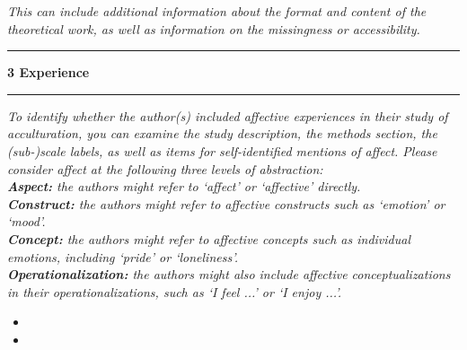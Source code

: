 \documentclass[10pt,a4paper]{protocol}
\newlength{\rulewidth}
\newlength{\ruleandnamegap}
\newcommand{\namefont}{\tiny}
\newcommand{\ruleandname}[2]{%
  \par\noindent
  \rule{#2}{\rulewidth}\par
  \vspace{\dimexpr-\baselineskip+\ruleandnamegap}
  \noindent{\namefont #1}\par
  \addvspace{\baselineskip}
}
\newcommand\category[2]{
{\Large\bfseries\color{emphasis} \vspace{0.25em} #1 \hspace{0.5em} #2 \\ [-0.6em] \rule{\textwidth}{0.4pt} \vspace{0.25em}}
}
\begin{document}
\clearpage
\vspace*{2em}

\textit{This can include additional information about the format and content of the theoretical work, as well as information on the missingness or accessibility.}
\vspace{1.5em}
\ruleandname{character string}{10cm}
\divider

\category{3}{Experience}

\textit{To identify whether the author(s) included affective experiences in their study of acculturation, you can examine the study description, the methods section, the (sub-)scale labels, as well as items for self-identified mentions of affect. Please consider affect at the following three levels of abstraction:\\
\textbf{Aspect:} the authors might refer to `affect' or `affective' directly.\\
\textbf{Construct:} the authors might refer to affective constructs such as `emotion' or `mood'.\\
\textbf{Concept:} the authors might refer to affective concepts such as individual emotions, including `pride' or `loneliness'.\\
\textbf{Operationalization:} the authors might also include affective conceptualizations in their operationalizations, such as `I feel ...' or `I enjoy ...'.}
\vspace{0.5em}
\begin{itemize}
	\item {}
	\item {}
\end{itemize}
\divider
\end{document}
